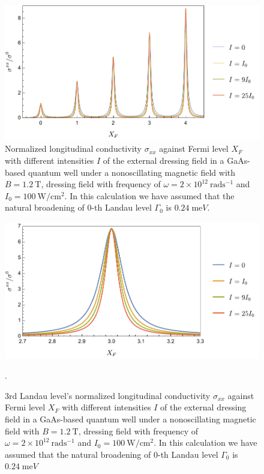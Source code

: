 \begin{figure}[t]
\includegraphics[scale=0.55]{figures/fig_5}
\caption{\label{fig_5} Normalized longitudinal conductivity $\sigma_{xx}$ against Fermi level $X_F$ with different intensities $I$ of the external dressing field in a GaAs-based quantum well under a nonoscillating magnetic field with $B = 1.2~\text{T}$, dressing field with frequency of $\omega =2\times10^{12}~\text{rad}\text{s}^{-1}$ and $I_0 =100~\text{W}/\text{cm}^{2}$. In this calculation we have assumed that the natural  broadening of $0$-th Landau level $\Gamma_0$ is $0.24\;\text{me}V$.}
\end{figure}
\begin{figure}[t]
\includegraphics[scale=0.55]{figures/fig_6}
\caption{\label{fig_6} $3$rd Landau level’s normalized longitudinal conductivity $\sigma_{xx}$ against Fermi level $X_F$ with different intensities $I$ of the external dressing field in a GaAs-based quantum well under a nonoscillating magnetic field with $B = 1.2~\text{T}$, dressing field with frequency of $\omega =2\times10^{12}~\text{rad}\text{s}^{-1}$ and $I_0 =100~\text{W}/\text{cm}^{2}$. In this calculation we have assumed that the natural  broadening of $0$-th Landau level $\Gamma_0$ is $0.24\;\text{me}V$}.
\end{figure}

